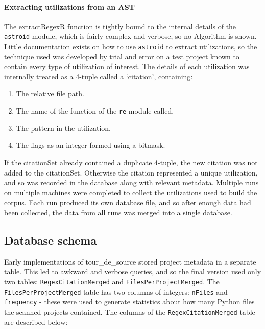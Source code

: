 \paragraph{Extracting utilizations from an AST}  The extractRegexR function is tightly bound to the internal details of the {\tt astroid} module, which is fairly complex and verbose, so no Algorithm is shown.  Little documentation exists on how to use {\tt astroid} to extract utilizations, so the technique used was developed by trial and error on a test project known to contain every type of utilization of interest.  The details of each utilization was internally treated as a 4-tuple called a `citation', containing:
\begin{enumerate} \itemsep -1pt
\item The relative file path.
\item The name of the function of the {\tt re} module called.
\item The pattern in the utilization.
\item The flags as an integer formed using a bitmask.
\end{enumerate}
If the citationSet already contained a duplicate 4-tuple, the new citation was not added to the citationSet.  Otherwise the citation represented a unique utilization, and so was recorded in the database along with relevant metadata.  Multiple runs on multiple machines were completed to collect the utilizations used to build the corpus.  Each run produced its own database file, and so after enough data had been collected, the data from all runs was merged into a single database.

\subsection{Database schema}
Early implementations of tour\_de\_source stored project metadata in a separate table.  This led to awkward and verbose queries, and so the final version used only two tables: {\tt RegexCitationMerged} and {\tt FilesPerProjectMerged}.  The {\tt FilesPerProjectMerged} table has two columns of integers: {\tt nFiles} and {\tt frequency} - these were used to generate statistics about how many Python files the scanned projects contained.  The columns of the {\tt RegexCitationMerged} table are described below:

